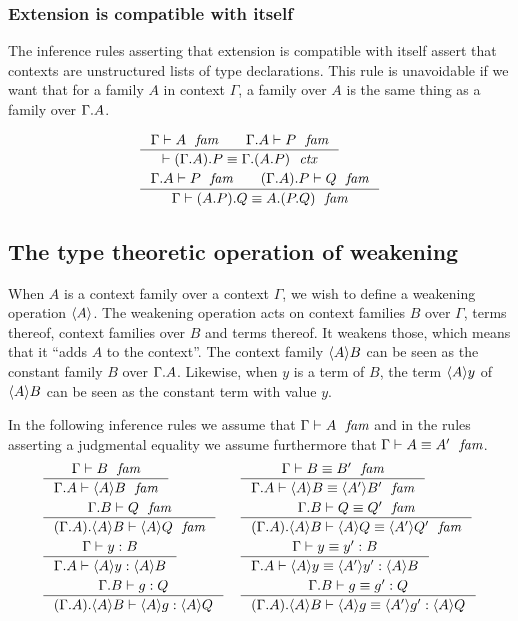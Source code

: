 \subsubsection{Extension is compatible with itself}\label{comp-ee}
The inference rules asserting that extension is compatible with itself assert
that contexts are unstructured lists of type declarations. This rule is
unavoidable if we want that for a family $A$ in context $\Gamma$, a family over
$A$ is the same thing as a family over $\ctxext{\Gamma}{A}$. 

\begin{align}
& \inference{\jfam{\Gamma}{A}\qquad\jfam{\ctxext{\Gamma}{A}}{P}}
  {\jctxeq{\ctxext{{\Gamma}{A}}{P}}{\ctxext{\Gamma}{{A}{P}}}}\\
& \inference{\jfam{\ctxext{\Gamma}{A}}{P}\qquad\jfam{\ctxext{{\Gamma}{A}}{P}}{Q}}
  {\jfameq{\Gamma}{\ctxext{{A}{P}}{Q}}{\ctxext{A}{{P}{Q}}}}
\end{align}

\subsection{The type theoretic operation of weakening}
When $A$ is a context family over a context $\Gamma$, we wish to define a weakening
operation $\ctxwk{A}{}$. The weakening operation acts on context families $B$ 
over $\Gamma$, terms thereof, context families over $B$ and terms thereof.
It weakens those, which means that it ``adds $A$ to the context''. The context
family $\ctxwk{A}{B}$ can be seen as the constant family $B$ over $\ctxext{\Gamma}{A}$.
Likewise, when $y$ is a term of $B$, the term $\ctxwk{A}{y}$ of $\ctxwk{A}{B}$
can be seen as the constant term with value $y$.
 
 In the following inference rules we assume that $\jfam{\Gamma}{A}$ and in the
 rules asserting a judgmental equality we assume furthermore that 
 $\jfameq{\Gamma}{A}{A'}$.
\begin{align}
& \inference{\jfam{\Gamma}{B}}{\jfam{\ctxext{\Gamma}{A}}{\ctxwk{A}{B}}}
& & \inference{\jfameq{\Gamma}{B}{B'}}{\jfameq{\ctxext{\Gamma}{A}}{\ctxwk{A}{B}}{\ctxwk{A'}{B'}}}\\
& \inference{\jfam{\ctxext{\Gamma}{B}}{Q}}
{\jfam{\ctxext{{\Gamma}{A}}{\ctxwk{A}{B}}}{\ctxwk{A}{Q}}}
& & \inference{\jfameq{\ctxext{\Gamma}{B}}{Q}{Q'}}
{\jfameq{\ctxext{{\Gamma}{A}}{\ctxwk{A}{B}}}{\ctxwk{A}{Q}}{\ctxwk{A'}{Q'}}}\\
& \inference{\jterm{\Gamma}{B}{y}}{\jterm{\ctxext{\Gamma}{A}}{\ctxwk{A}{B}}{\ctxwk{A}{y}}}
& & \inference{\jtermeq{\Gamma}{B}{y}{y'}}{\jtermeq{\ctxext{\Gamma}{A}}{\ctxwk{A}{B}}{\ctxwk{A}{y}}{\ctxwk{A'}{y'}}}\\
& \inference{\jterm{\ctxext{\Gamma}{B}}{Q}{g}}{\jterm{\ctxext{{\Gamma}{A}}{\ctxwk{A}{B}}}{\ctxwk{A}{Q}}{\ctxwk{A}{g}}}
& & \inference{\jtermeq{\ctxext{\Gamma}{B}}{Q}{g}{g'}}
{\jtermeq{\ctxext{{\Gamma}{A}}{\ctxwk{A}{B}}}{\ctxwk{A}{Q}}{\ctxwk{A}{g}}{\ctxwk{A'}{g'}}}
\end{align}

